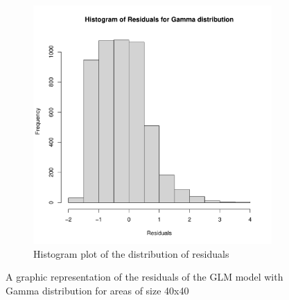 \documentclass[12pt,a4paper,twoside]{article}
\begin{document}
\begin{figure}[!ht]
\begin{subfigure}{.45\textwidth}
        \includegraphics[width=\linewidth]{img/Gamma_distribution_histogram_40x40.pdf}
        \caption{Histogram plot of the distribution of residuals}
        \label{fig:gammahist40}
    \end{subfigure}
    \caption{A graphic representation of the residuals of the GLM model with Gamma
    distribution for areas of size 40x40}
    \label{fig:gammafig40}
\end{figure}

\newpage
\end{document}
